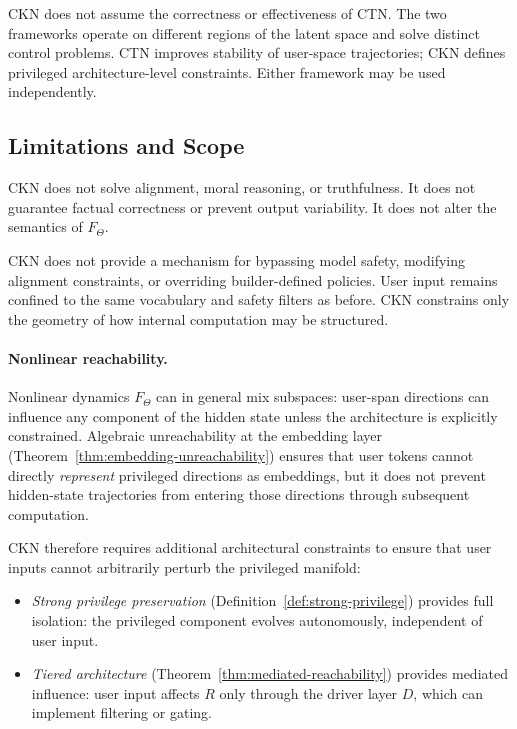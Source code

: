 \documentclass[11pt,a4paper]{article}
\begin{document}
CKN does not assume the correctness or effectiveness of CTN. The two frameworks operate on different regions of the latent space and solve distinct control problems. CTN improves stability of user-space trajectories; CKN defines privileged architecture-level constraints. Either framework may be used independently.

\subsection{Limitations and Scope}

CKN does not solve alignment, moral reasoning, or truthfulness. It does not guarantee factual correctness or prevent output variability. It does not alter the semantics of $F_\Theta$.

CKN does not provide a mechanism for bypassing model safety, modifying alignment constraints, or overriding builder-defined policies. User input remains confined to the same vocabulary and safety filters as before. CKN constrains only the geometry of how internal computation may be structured.

\paragraph{Nonlinear reachability.}
Nonlinear dynamics $F_\Theta$ can in general mix subspaces: user-span directions can influence any component of the hidden state unless the architecture is explicitly constrained. Algebraic unreachability at the embedding layer (Theorem~\ref{thm:embedding-unreachability}) ensures that user tokens cannot directly \emph{represent} privileged directions as embeddings, but it does not prevent hidden-state trajectories from entering those directions through subsequent computation.

CKN therefore requires additional architectural constraints to ensure that user inputs cannot arbitrarily perturb the privileged manifold:
\begin{itemize}
    \item \emph{Strong privilege preservation} (Definition~\ref{def:strong-privilege}) provides full isolation: the privileged component evolves autonomously, independent of user input.
    \item \emph{Tiered architecture} (Theorem~\ref{thm:mediated-reachability}) provides mediated influence: user input affects $R$ only through the driver layer $D$, which can implement filtering or gating.
\end{itemize}
\end{document}

